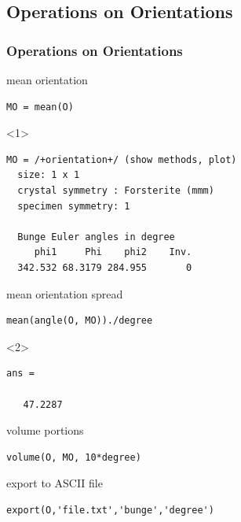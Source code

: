 \documentclass[compress]{beamer}
\begin{document}
\subsection*{Operations on Orientations}

\begin{frame}[fragile]
  \frametitle{Operations on Orientations}




mean orientation
  \begin{lstlisting}[style=input]
MO = mean(O)
  \end{lstlisting}

  \begin{onlyenv}<1>
    \begin{lstlisting}[style=output]
MO = /+orientation+/ (show methods, plot)
  size: 1 x 1
  crystal symmetry : Forsterite (mmm)
  specimen symmetry: 1

  Bunge Euler angles in degree
     phi1     Phi    phi2    Inv.
  342.532 68.3179 284.955       0
    \end{lstlisting}
  \end{onlyenv}

\pause
\medskip

  mean orientation spread
  \begin{lstlisting}[style=input]
mean(angle(O, MO))./degree
  \end{lstlisting}

  \begin{onlyenv}<2>
    \begin{lstlisting}[style=output]
ans =

   47.2287
\end{lstlisting}
  \end{onlyenv}

\pause
\medskip

volume portions
\begin{lstlisting}[style=input]
volume(O, MO, 10*degree)
\end{lstlisting}

\pause
\medskip

export to ASCII file
\begin{lstlisting}[style=input]
export(O,'file.txt','bunge','degree')
\end{lstlisting}

\end{frame}
\end{document}
